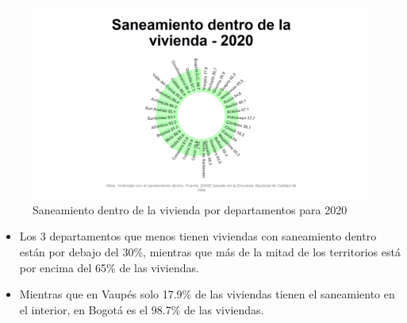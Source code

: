     \begin{figure}[H]
        \caption{Saneamiento dentro de la vivienda por departamentos para 2020 \label{map_result_2} }
        \begin{center}
        \includegraphics[width=\textwidth,keepaspectratio]{img/var_193_static.png}
        \end{center}
    \end{figure}
            \begin{itemize}
                    \item Los 3 departamentos que menos tienen viviendas con saneamiento dentro están por debajo del 30\%, mientras que más de la mitad de los territorios está por encima del 65\% de las viviendas.
                    \item Mientras que en Vaupés solo 17.9\% de las viviendas tienen el saneamiento en el interior, en Bogotá es el 98.7\% de las viviendas.
                    \end{itemize}

